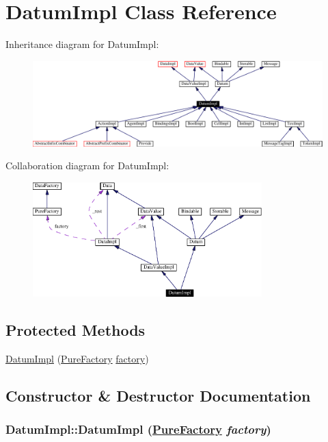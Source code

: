 \hypertarget{classDatumImpl}{
\section{Datum\-Impl  Class Reference}
\label{classDatumImpl}
}
Inheritance diagram for Datum\-Impl:\begin{figure}[H]
\begin{center}
\leavevmode
\includegraphics[width=381pt]{classDatumImpl__inherit__graph}
\end{center}
\end{figure}
Collaboration diagram for Datum\-Impl:\begin{figure}[H]
\begin{center}
\leavevmode
\includegraphics[width=251pt]{classDatumImpl__coll__graph}
\end{center}
\end{figure}
\subsection*{Protected Methods}
\begin{CompactItemize}
\item 
\hyperlink{classDatumImpl_b0}{Datum\-Impl} (\hyperlink{classPureFactory}{Pure\-Factory} \hyperlink{classDataImpl_o0}{factory})
\end{CompactItemize}


\subsection{Constructor \& Destructor Documentation}
\hypertarget{classDatumImpl_b0}{
\subsubsection[DatumImpl]{\setlength{\rightskip}{0pt plus 5cm}Datum\-Impl::Datum\-Impl (\hyperlink{classPureFactory}{Pure\-Factory} {\em factory})}}
\label{classDatumImpl_b0}




